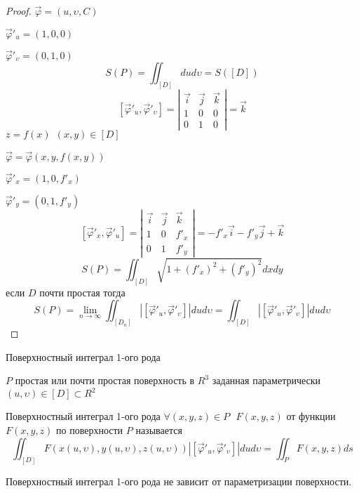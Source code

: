 \begin{proof}
  $\vec \varphi = (u, \upsilon, C)$

  $\vec \varphi'_u = (1,0,0)$

  $\vec \varphi'_{\upsilon} = (0,1,0)$
  $$
  S(P) = \iint_{[D]} dud\upsilon = S([D])
  $$
  $$
  [\vec \varphi'_u, \vec \varphi'_{\upsilon}] =
  \left|
  \begin{array}{ccc}
    \vec i & \vec j & \vec k \\
    1 & 0 & 0 \\
    0 & 1 & 0
  \end{array}
  \right| = \vec k
  $$
  $z = f(x) ~~ (x, y) \in [D]$

  $\vec \varphi = \vec \varphi(x, y, f(x,y))$

  $\vec \varphi'_x = (1, 0, f'_x)$

  $\vec \varphi'_y = (0, 1, f'_y)$
  $$
  [\vec \varphi'_x, \vec \varphi'_u] =
  \left|
  \begin{array}{ccc}
    \vec i & \vec j & \vec k \\
    1 & 0 & f'_x \\
    0 & 1 & f'_y
  \end{array}
  \right| = -f'_x \vec i - f'_y \vec j + \vec k
  $$
  $$
  S(P) = \iint_{[D]} \sqrt{1 + (f'_x)^2 + (f'_y)^2} dxdy
  $$
  если $D$ почти простая тогда
  $$
  S(P) = \lim_{n \to \infty} \iint_{[D_n]} |[\vec \varphi'_u,
  \vec \varphi'_{\upsilon}]| du d\upsilon = \iint_{[D]} |[\vec \varphi'_u,
  \vec \varphi'_{\upsilon}]| du d\upsilon
  $$
\end{proof}

\begin{title}[\Large]
  Поверхностный интеграл 1-ого рода
\end{title}

\begin{define}
  $P$ простая или почти простая поверхность в $R^3$ заданная параметрически
  $(u, \upsilon) \in [D] \subset R^2$

  Поверхностный интеграл 1-ого рода $\forall (x,y,z) \in P ~~~ F(x,y,z)$ от
  функции $F(x,y,z)$ по поверхности $P$ называется
  $$
  \iint_{[D]} F(x(u, \upsilon), y(u,\upsilon), z(u, \upsilon))
  |[\vec \varphi'_u, \vec \varphi'_{\upsilon}]| du d\upsilon =
  \iint_P F(x,y,z) ds
  $$
\end{define}

\begin{theorem}
  Поверхностный интеграл 1-ого рода не зависит от параметризации поверхности.
\end{theorem}

